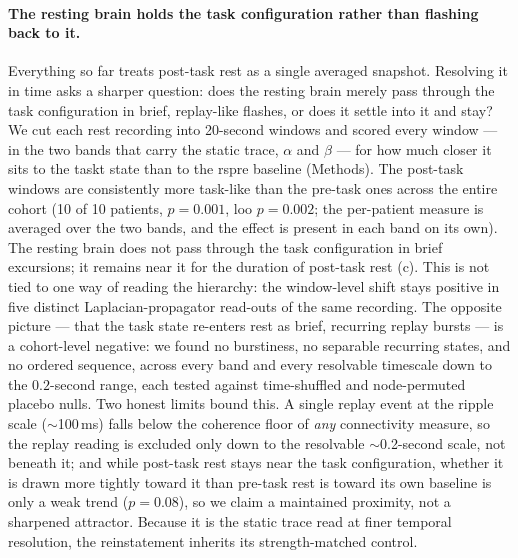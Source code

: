 \paragraph{The resting brain holds the task configuration rather than flashing back to it.}
Everything so far treats post-task rest as a single averaged snapshot. Resolving it in time asks a sharper question: does the resting brain merely pass through the task configuration in brief, replay-like flashes, or does it settle into it and stay? We cut each rest recording into 20-second windows and scored every window --- in the two bands that carry the static trace, \(\alpha\) and \(\beta\) --- for how much closer it sits to the \acrshort{taskt} state than to the \acrshort{rspre} baseline (Methods). The post-task windows are consistently more task-like than the pre-task ones across the entire cohort (10 of 10 patients, \(p = 0.001\), \gls{loo} \(p = 0.002\); the per-patient measure is averaged over the two bands, and the effect is present in each band on its own). The resting brain does not pass through the task configuration in brief excursions; it remains near it for the duration of post-task rest (c). This is not tied to one way of reading the hierarchy: the window-level shift stays positive in five distinct Laplacian-propagator read-outs of the same recording. The opposite picture --- that the task state re-enters rest as brief, recurring replay bursts \cite{schuckniv2019sequential} --- is a cohort-level negative: we found no burstiness, no separable recurring states, and no ordered sequence, across every band and every resolvable timescale down to the \(0.2\)-second range, each tested against time-shuffled and node-permuted placebo nulls. Two honest limits bound this. A single replay event at the ripple scale (\(\sim\)100\,ms) falls below the coherence floor of \emph{any} connectivity measure, so the replay reading is excluded only down to the resolvable \(\sim\)0.2-second scale, not beneath it; and while post-task rest stays near the task configuration, whether it is drawn more tightly toward it than pre-task rest is toward its own baseline is only a weak trend (\(p = 0.08\)), so we claim a maintained proximity, not a sharpened attractor. Because it is the static trace read at finer temporal resolution, the reinstatement inherits its strength-matched control.

